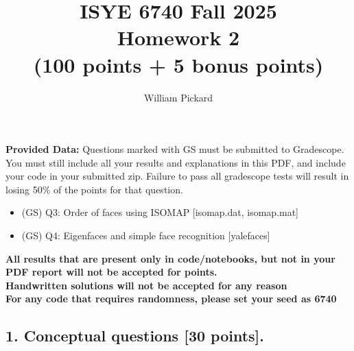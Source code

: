 \documentclass[twoside,10pt]{article}
\begin{document}
\title{ISYE 6740 Fall 2025\\ Homework 2 \\
(100 points + 5 bonus points)}
\author{William Pickard}
\date{}

\maketitle

\textbf{Provided Data:}
Questions marked with GS must be submitted to Gradescope. You must still include all your results and explanations in this PDF, and include your code in your submitted zip. Failure to pass all gradescope tests will result in losing 50\% of the points for that question.

\begin{itemize}
    \item (GS) Q3: Order of faces using ISOMAP [isomap.dat, isomap.mat]
    \item (GS) Q4: Eigenfaces and simple face recognition [yalefaces]
\end{itemize}

\leavevmode\newline
\textbf{All results that are present only in code/notebooks, but not in your PDF report will not be accepted for points.}\\
\textbf{Handwritten solutions will not be accepted for any reason}\\
\textbf{For any code that requires randomness, please set your seed as 6740}

\subsection*{1. Conceptual questions [30 points].}
\end{document}
